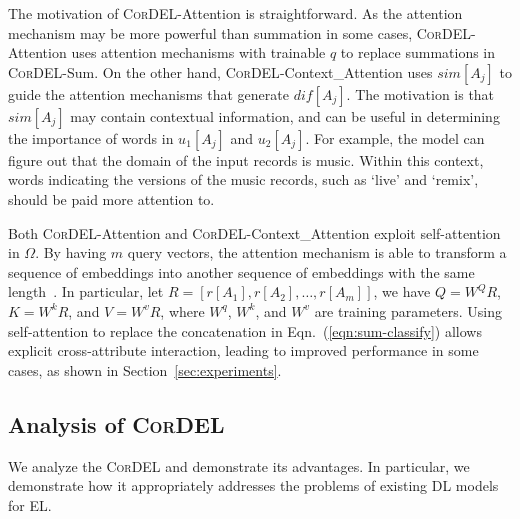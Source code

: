 \documentclass[conference]{IEEEtran}
\begin{document}
The motivation of \textsc{CorDEL}-Attention is straightforward. As the attention mechanism may be more powerful than summation in some cases, \textsc{CorDEL}-Attention uses attention mechanisms with trainable $q$ to replace summations in \textsc{CorDEL}-Sum. On the other hand,  \textsc{CorDEL}-Context\_Attention uses $sim[A_j]$ to guide the attention mechanisms that generate $dif[A_j]$. The motivation is that $sim[A_j]$ may contain contextual information, and can be useful in determining the importance of words in $u_1[A_j]$ and $u_2[A_j]$. For example, the model can figure out that the domain of the input records is music. Within this context, words indicating the versions of the music records, such as `live' and `remix', should be paid more attention to.

Both \textsc{CorDEL}-Attention and \textsc{CorDEL}-Context\_Attention exploit self-attention~\cite{vaswani2017attention,devlin2019bert} in $\Omega$. By having $m$ query vectors, the attention mechanism is able to transform a sequence of embeddings into another sequence of embeddings with the same length~\cite{vaswani2017attention,devlin2019bert}. In particular, let $R= [r[A_1],r[A_2],\ldots,r[A_m]]$, we have $Q= W^Q R$, $K = W^k R$, and $V = W^v R$, where $W^q$, $W^k$, and $W^v$ are training parameters. Using self-attention to replace the concatenation in Eqn.~(\ref{eqn:sum-classify}) allows explicit cross-attribute interaction, leading to improved performance in some cases, as shown in Section~\ref{sec:experiments}.

\subsection{Analysis of \textsc{CorDEL}}\label{sec:pros}

We analyze the \textsc{CorDEL} and demonstrate its advantages. In particular, we demonstrate how it appropriately addresses the problems of existing DL models for EL.
\end{document}
